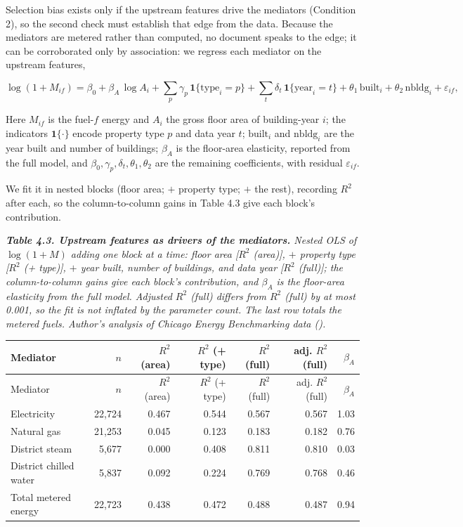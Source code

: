 Selection bias exists only if the upstream features drive the mediators (Condition 2), so the second check must establish that edge from the data. Because the mediators are metered rather than computed, no document speaks to the edge; it can be corroborated only by association: we regress each mediator on the upstream features,

\[
\log(1 + M_{if}) = \beta_0 + \beta_A\, \log A_i + \sum_p \gamma_p\, \mathbf{1}\{\text{type}_i = p\} + \sum_t \delta_t\, \mathbf{1}\{\text{year}_i = t\} + \theta_1\, \text{built}_i + \theta_2\, \text{nbldg}_i + \varepsilon_{if} ,
\]

Here $M_{if}$ is the fuel-$f$ energy and $A_i$ the gross floor area of building-year $i$; the indicators $\mathbf{1}\{\cdot\}$ encode property type $p$ and data year $t$; $\text{built}_i$ and $\text{nbldg}_i$ are the year built and number of buildings; $\beta_A$ is the floor-area elasticity, reported from the full model, and $\beta_0, \gamma_p, \delta_t, \theta_1, \theta_2$ are the remaining coefficients, with residual $\varepsilon_{if}$.

We fit it in nested blocks (floor area; $+$ property type; $+$ the rest), recording $R^2$ after each, so the column-to-column gains in Table 4.3 give each block's contribution.

\par\medskip\noindent
{\small\itshape \textbf{Table 4.3. Upstream features as drivers of the mediators.} Nested OLS of $\log(1+M)$ adding one block at a time: floor area [$R^2$ (area)], $+$ property type [$R^2$ (+ type)], $+$ year built, number of buildings, and data year [$R^2$ (full)]; the column-to-column gains give each block's contribution, and $\beta_A$ is the floor-area elasticity from the full model. Adjusted $R^2$ (full) differs from $R^2$ (full) by at most 0.001, so the fit is not inflated by the parameter count. The last row totals the metered fuels. Author's analysis of Chicago Energy Benchmarking data ().\par}
\nopagebreak\medskip\nopagebreak
{
\footnotesize
\setlength{\tabcolsep}{5pt}
\renewcommand{\arraystretch}{1.15}
\begin{longtable}{lrrrrrr}
\toprule
Mediator & $n$ & $R^2$ (area) & $R^2$ (+ type) & $R^2$ (full) & adj. $R^2$ (full) & $\beta_A$ \\
\midrule
\endfirsthead
\toprule
Mediator & $n$ & $R^2$ (area) & $R^2$ (+ type) & $R^2$ (full) & adj. $R^2$ (full) & $\beta_A$ \\
\midrule
\endhead
\bottomrule
\endlastfoot
Electricity & 22,724 & 0.467 & 0.544 & 0.567 & 0.567 & 1.03 \\
Natural gas & 21,253 & 0.045 & 0.123 & 0.183 & 0.182 & 0.76 \\
District steam & 5,677 & 0.000 & 0.408 & 0.811 & 0.810 & 0.03 \\
District chilled water & 5,837 & 0.092 & 0.224 & 0.769 & 0.768 & 0.46 \\
Total metered energy & 22,723 & 0.438 & 0.472 & 0.488 & 0.487 & 0.94 \\
\end{longtable}
}
\par\medskip

